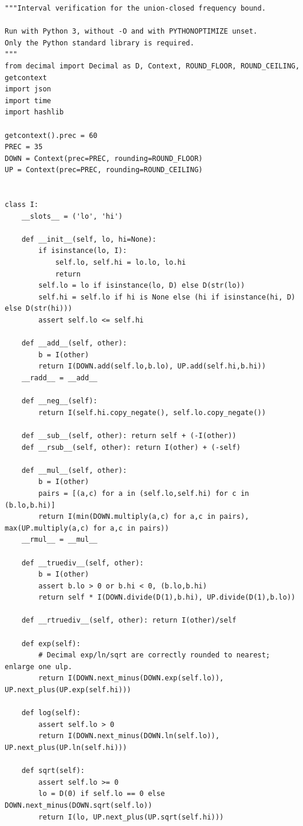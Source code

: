 \documentclass[11pt]{article}
\theoremstyle{remark}
\begin{document}
\begin{lstlisting}
"""Interval verification for the union-closed frequency bound.

Run with Python 3, without -O and with PYTHONOPTIMIZE unset.
Only the Python standard library is required.
"""
from decimal import Decimal as D, Context, ROUND_FLOOR, ROUND_CEILING, getcontext
import json
import time
import hashlib

getcontext().prec = 60
PREC = 35
DOWN = Context(prec=PREC, rounding=ROUND_FLOOR)
UP = Context(prec=PREC, rounding=ROUND_CEILING)


class I:
    __slots__ = ('lo', 'hi')

    def __init__(self, lo, hi=None):
        if isinstance(lo, I):
            self.lo, self.hi = lo.lo, lo.hi
            return
        self.lo = lo if isinstance(lo, D) else D(str(lo))
        self.hi = self.lo if hi is None else (hi if isinstance(hi, D) else D(str(hi)))
        assert self.lo <= self.hi

    def __add__(self, other):
        b = I(other)
        return I(DOWN.add(self.lo,b.lo), UP.add(self.hi,b.hi))
    __radd__ = __add__

    def __neg__(self):
        return I(self.hi.copy_negate(), self.lo.copy_negate())

    def __sub__(self, other): return self + (-I(other))
    def __rsub__(self, other): return I(other) + (-self)

    def __mul__(self, other):
        b = I(other)
        pairs = [(a,c) for a in (self.lo,self.hi) for c in (b.lo,b.hi)]
        return I(min(DOWN.multiply(a,c) for a,c in pairs), max(UP.multiply(a,c) for a,c in pairs))
    __rmul__ = __mul__

    def __truediv__(self, other):
        b = I(other)
        assert b.lo > 0 or b.hi < 0, (b.lo,b.hi)
        return self * I(DOWN.divide(D(1),b.hi), UP.divide(D(1),b.lo))

    def __rtruediv__(self, other): return I(other)/self

    def exp(self):
        # Decimal exp/ln/sqrt are correctly rounded to nearest; enlarge one ulp.
        return I(DOWN.next_minus(DOWN.exp(self.lo)), UP.next_plus(UP.exp(self.hi)))

    def log(self):
        assert self.lo > 0
        return I(DOWN.next_minus(DOWN.ln(self.lo)), UP.next_plus(UP.ln(self.hi)))

    def sqrt(self):
        assert self.lo >= 0
        lo = D(0) if self.lo == 0 else DOWN.next_minus(DOWN.sqrt(self.lo))
        return I(lo, UP.next_plus(UP.sqrt(self.hi)))


\end{lstlisting}
\end{document}
